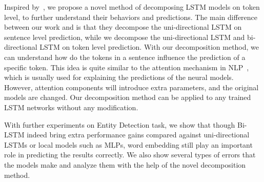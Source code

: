 \documentclass{article}
\begin{document}
Inspired by~\citet{murdoch2017automatic}, we propose a novel method of decomposing LSTM models on token level, to further understand their behaviors and predictions. The main difference between our work and \citet{murdoch2017automatic} is that they decompose the uni-directional LSTM on sentence level prediction, while we decompose the uni-directional LSTM and bi-directional LSTM on token level prediction. With our decomposition method, we can understand how do the tokens in a sentence influence the prediction of a specific token. This idea is quite similar to the attention mechanism in NLP~\cite{bahdanau2014neural}, which is usually used for explaining the predictions of the neural models. However, attention components will introduce extra parameters, and the original models are changed. Our decomposition method can be applied to any trained LSTM networks without any modification. 

With further experiments on Entity Detection task, we show that though Bi-LSTM indeed bring extra performance gains compared against uni-directional LSTMs or local models such as MLPs, word embedding still play an important role in predicting the results correctly. We also show several types of errors that the models make and analyze them with the help of the novel decomposition method. 



\end{document}
